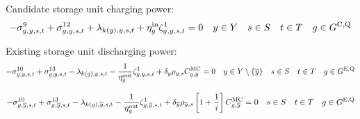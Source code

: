 \documentclass{article}
\begin{document}
Candidate storage unit charging power:
\begin{equation}
- \dNonNegativeCharging + \dMaxChargingRateCandidate + \dPowerBalance[k(\iGenerator),\iYear,\iScenario,\iInterval] + \cStorageUnitEfficiencyCharging\dStorageEnergyTransition = 0 \quad \iYear \in \sYears \quad \iScenario \in \sScenarios \quad \iInterval \in \sIntervals \quad \iGenerator \in \sStorageCandidate
\end{equation}

Existing storage unit discharging power:
\begin{equation}
- \dNonNegativeDischarging + \dMaxDischargingRateExisting - \dPowerBalance[k(\iGenerator),\iYear,\iScenario,\iInterval] - \frac{1}{\cStorageUnitEfficiencyDischarging} \dStorageEnergyTransition + \cDiscountRate \cScenarioDuration \cMarginalCost = 0 \quad \iYear \in \sYears \setminus \{\iYearTerminal\} \quad \iScenario \in \sScenarios \quad \iInterval \in \sIntervals  \quad \iGenerator \in \sStorageExisting
\end{equation}

\begin{equation}
- \dNonNegativeDischarging[\iGenerator,\iYearTerminal,\iScenario,\iInterval] + \dMaxDischargingRateExisting[\iGenerator,\iYearTerminal,\iScenario,\iInterval] - \dPowerBalance[k(\iGenerator),\iYearTerminal,\iScenario,\iInterval] - \frac{1}{\cStorageUnitEfficiencyDischarging} \dStorageEnergyTransition[\iGenerator,\iYearTerminal,\iScenario,\iInterval] + \cDiscountRate[\iYearTerminal] \cScenarioDuration[\iYearTerminal,\iScenario] \left[1 + \frac{1}{\cInterestRate}\right] \cMarginalCost[\iGenerator,\iYearTerminal] = 0 \quad \iScenario \in \sScenarios \quad \iInterval \in \sIntervals \quad \iGenerator \in \sStorageExisting
\end{equation}
\end{document}
